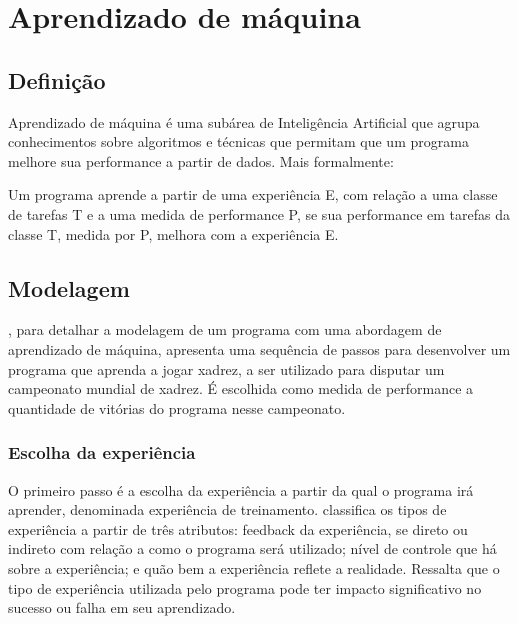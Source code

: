 \chapter{Aprendizado de máquina}

\section{Definição}

Aprendizado de máquina é uma subárea de Inteligência Artificial que agrupa conhecimentos sobre algoritmos e técnicas que permitam que um programa melhore sua performance a partir de dados. Mais formalmente:

\begin{citacao}
Um programa aprende a partir de uma experiência E, com relação a uma classe de tarefas T e a uma medida de performance P, se sua performance em tarefas da classe T, medida por P, melhora com a experiência E. \cite[p.2, tradução nossa]{Tom_mitchell}
\end{citacao}

\section{Modelagem}

\cite{Tom_mitchell}, para detalhar a modelagem de um programa com uma abordagem de aprendizado de máquina, apresenta uma sequência de passos para desenvolver um programa que aprenda a jogar xadrez, a ser utilizado para disputar um campeonato mundial de xadrez. É escolhida como medida de performance a quantidade de vitórias do programa nesse campeonato.

\subsection{Escolha da experiência}

O primeiro passo é a escolha da experiência a partir da qual o programa irá aprender, denominada experiência de treinamento. \cite{Tom_mitchell} classifica os tipos de experiência a partir de três atributos: feedback da experiência, se direto ou indireto com relação a como o programa será utilizado; nível de controle que há sobre a experiência; e quão bem a experiência reflete a realidade. Ressalta que o tipo de experiência utilizada pelo programa pode ter impacto significativo no sucesso ou falha em seu aprendizado. 


